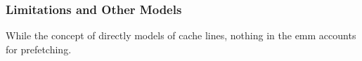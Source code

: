 
\subsubsection{Limitations and Other Models}


While the concept of  directly models 
 of cache lines,
nothing in the \gls{emm} accounts for  prefetching.




